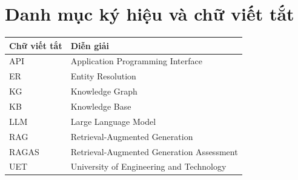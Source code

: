 \chapter*{Danh mục ký hiệu và chữ viết tắt}

\begin{tabularx}{\textwidth}{|p{}|X|}
\hline
\textbf{Chữ viết tắt} & \textbf{Diễn giải} \\
\hline
API & Application Programming Interface \\
\hline
ER & Entity Resolution \\
\hline
KG & Knowledge Graph \\
\hline
KB & Knowledge Base \\
\hline
LLM & Large Language Model \\
\hline
RAG & Retrieval-Augmented Generation \\
\hline
RAGAS & Retrieval-Augmented Generation Assessment \\
\hline
UET & University of Engineering and Technology \\
\hline
\end{tabularx}
